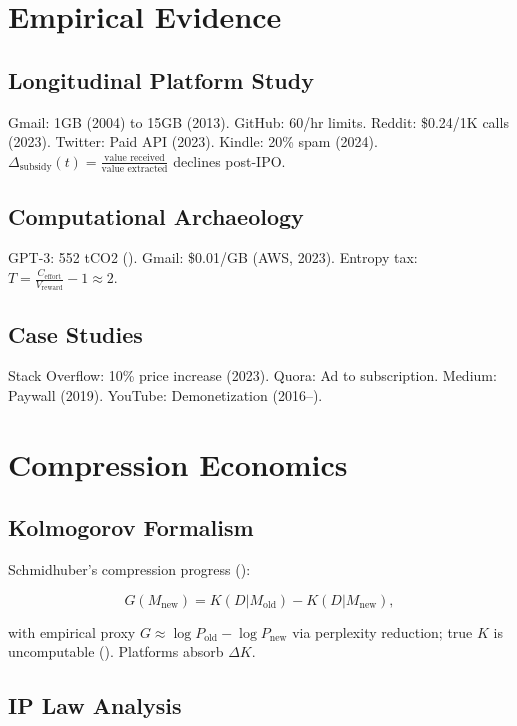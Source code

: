 \documentclass[12pt]{article}
\begin{document}
\section{Empirical Evidence}

\subsection{Longitudinal Platform Study}

Gmail: 1GB (2004) to 15GB (2013). GitHub: 60/hr limits. Reddit: \$0.24/1K calls (2023). Twitter: Paid API (2023). Kindle: 20\% spam (2024). \(\Delta_{\text{subsidy}}(t) = \frac{\text{value received}}{\text{value extracted}}\) declines post-IPO.

\subsection{Computational Archaeology}

GPT-3: 552 tCO2 (\citealp{Patterson2021}). Gmail: \$0.01/GB (AWS, 2023). Entropy tax: \(T = \frac{C_{\text{effort}}}{V_{\text{reward}}} - 1 \approx 2\).

\subsection{Case Studies}

Stack Overflow: 10\% price increase (2023). Quora: Ad to subscription. Medium: Paywall (2019). YouTube: Demonetization (2016–).

\section{Compression Economics}

\subsection{Kolmogorov Formalism}

Schmidhuber’s compression progress (\citealp{Schmidhuber2009}):

\[
G(M_{\text{new}}) = K(D | M_{\text{old}}) - K(D | M_{\text{new}}),
\]

with empirical proxy \( G \approx \log P_{\text{old}} - \log P_{\text{new}} \) via perplexity reduction; true \( K \) is uncomputable (\citealp{LiVitanyi2019}). Platforms absorb \(\Delta K\).

\subsection{IP Law Analysis}
\end{document}
